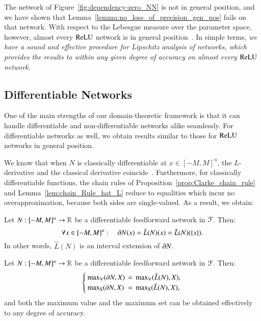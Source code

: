 \documentclass[11pt,times]{article}
\begin{document}
The network of Figure~\ref{fig:dependency-zero_NN} is not in general
position, and we have shown that
Lemma~\ref{lemma:no_loss_of_precision_gen_pos} fails on that
network. With respect to the Lebesgue measure over the parameter
space, however, almost every $\operatorname{\mathrm{ReLU}}$ network is in general
position~\parencite[Theorem~4]{Jordan_Dimakis:Exactly_NeurIPS:2020}. In
simple terms, \emph{we have a sound and effective procedure for
  Lipschitz analysis of networks, which provides the results to within
  any given degree of accuracy on almost every $\operatorname{\mathrm{ReLU}}$ network}.



 
\subsection{Differentiable Networks}
\label{subsec:differentiable_networks}


One of the main strengths of our domain-theoretic framework is that it
can handle differentiable and non-differentiable networks alike
seamlessly. For differentiable networks as well, we obtain results
similar to those for $\operatorname{\mathrm{ReLU}}$ networks in general position.

We know that when $N$ is classically differentiable at
$x \in [-M,M]^n$, the $L$-derivative and the classical derivative
coincide~\parencite{Edalat:2008:Continuous_Derivative}. Furthermore, for
classically differentiable functions, the chain rules of
Proposition~\ref{prop:Clarke_chain_rule} and
Lemma~\ref{lem:chain_Rule_hat_L} reduce to equalities which incur no
overapproximation, because both sides are single-valued. As a result,
we obtain:
%
\begin{lemma}
  \label{lemma:no_loss_of_precision_differentiable}
  Let $N : [-M,M]^n \to \mathbb{R}$ be a differentiable feedforward network in
  ${\cal F}$. Then:
  \begin{equation*}
    \forall x \in [-M,M]^n:\quad \partial N(x) = \hat{L}(N)(x) =
    \tilde{L}(N)(\left\{{x}\right\}). 
  \end{equation*}
%
  \noindent
  In other words, $\hat{L}(N)$ is an interval extension of
  $\partial N$.
\end{lemma}
%

\begin{theorem}
  \label{thm:differentiable_networks}
  Let $N : [-M,M]^n \to \mathbb{R}$ be a differentiable feedforward network in
  ${\cal F}$. Then:
  \begin{equation*}
    \left\{
      \arrayoptions{0.5ex}{1.2}
      \begin{array}{lcl}
        \maxV(\clarke{N},X) &= &\maxV(\tilde{L}(N), X),\\
        \maxS(\clarke{N},X) &= &\maxS(\tilde{L}(N), X),
      \end{array}
    \right.
  \end{equation*}
  \noindent
  and both the maximum value and the maximum set can be obtained
  effectively to any degree of accuracy.
\end{theorem}
\end{document}
